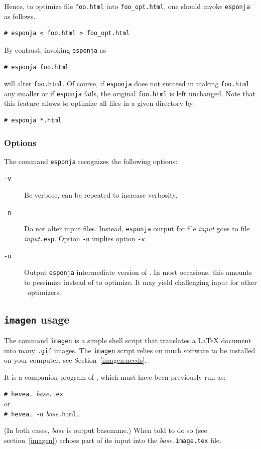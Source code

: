 Hence, to optimize file \texttt{foo.html} into \texttt{foo\_opt.html},
one should invoke \texttt{esponja} as follows.
\begin{verbatim}
# esponja < foo.html > foo_opt.html
\end{verbatim}
By contrast, invoking \texttt{esponja} as
\begin{verbatim}
# esponja foo.html
\end{verbatim}
will alter \texttt{foo.html}.
Of course, if \texttt{esponja} does not succeed in making \texttt{foo.html} any
smaller or if \texttt{esponja} fails, the original \texttt{foo.html}
is left unchanged.
Note that this feature allows to optimize all \html{} files in a given directory
by:
\begin{verbatim}
# esponja *.html
\end{verbatim}



\subsubsection{Options}\label{esponjaoptions}
The command \texttt{esponja} recognizes the following options:
\begin{description}
\item[{\tt -v}]Be verbose, can be repeated to increase verbosity.
\item[{\tt -n}]Do not alter input files. Instead, \texttt{esponja}
output for file \textit{input} goes to file
\textit{input}\texttt{.esp}. Option \texttt{-n}
implies option \texttt{-v}.
\item[{\tt -u}]Output \texttt{esponja} intermediate version of \html.
In most occasions, this amounts to pessimize instead of to optimize.
It may yield challenging input for other \html~optimizers.
\end{description}


\subsection{\texttt{imagen} usage}\label{imagenusage}
The command \texttt{imagen} is a simple shell script that translates
a \LaTeX{} document into many \texttt{.gif} images.
The \texttt{imagen} script relies on much software to be installed on
your computer, see Section~\ref{imagen:needs}.

It is a companion program of \hevea{}, which must have been previously run as:
\begin{flushleft}
\texttt{\# hevea}\ldots{} \textit{base}\texttt{.tex}\\
or\\
\texttt{\# hevea}\ldots{} \texttt{-o} \textit{base}\texttt{.html}\ldots\\
\end{flushleft}
(In both cases, \textit{base} is \hevea{} output basename.)
When told to do so (see section~\ref{imagen})
\hevea{} echoes part of its input into
the \textit{base}\texttt{.image.tex} file.

